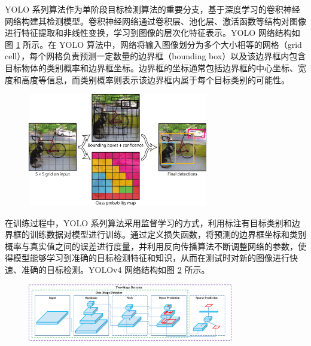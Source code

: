 YOLO 系列\cite{yolov1, yolov2, yolov3, yolov4, yolov6, yolov7, yolov8, yolov9, yolov10, yolov11}算法作为单阶段目标检测算法的重要分支，基于深度学习的卷积神经网络构建其检测模型。卷积神经网络通过卷积层、池化层、激活函数等结构对图像进行特征提取和非线性变换，学习到图像的层次化特征表示。YOLO 网络结构如图 \ref{fig:yolov1} 所示。在 YOLO 算法中，网络将输入图像划分为多个大小相等的网格（grid cell），每个网格负责预测一定数量的边界框（bounding box）以及该边界框内包含目标物体的类别概率和边界框坐标。边界框的坐标通常包括边界框的中心坐标、宽度和高度等信息，而类别概率则表示该边界框内属于每个目标类别的可能性。

\begin{figure}[htbp]
    \centering
    \includegraphics[width=0.7\textwidth]{../figure/yolov1.png}
    \captionsetup{font=footnotesize}
    \label{fig:yolov1}
\end{figure}

在训练过程中，YOLO 系列算法采用监督学习的方式，利用标注有目标类别和边界框的训练数据对模型进行训练。通过定义损失函数，将预测的边界框坐标和类别概率与真实值之间的误差进行度量，并利用反向传播算法不断调整网络的参数，使得模型能够学习到准确的目标检测特征和知识，从而在测试时对新的图像进行快速、准确的目标检测。YOLOv4 网络结构如图 \ref{fig:yolov4} 所示。

\begin{figure}[htbp]
    \centering
    \includegraphics[width=0.8\textwidth]{../figure/yolov4.png}
    \captionsetup{font=footnotesize}
    \label{fig:yolov4}
\end{figure}

